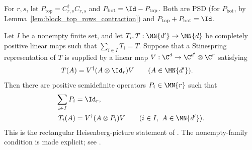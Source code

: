\begin{definition}
    \label{def:block_diag_projectors}
    \leanok
    For $r,s$, let $P_{\mathrm{top}}=C_{r,s}^\dagger C_{r,s}$ and
    $P_{\mathrm{bot}}=\Id-P_{\mathrm{top}}$. Both are PSD
    (for $P_{\mathrm{bot}}$, by Lemma~\ref{lem:block_top_rows_contraction})
    and $P_{\mathrm{top}}+P_{\mathrm{bot}}=\Id$.
\end{definition}

\begin{theorem}
    \label{thm:cp_radon_nikodym_of_stinespring}
    \leanok
    Let $I$ be a nonempty finite set, and let
    $T_i,T:\MN{d'}\to\MN{d}$ be completely positive linear maps such that
    $\sum_{i\in I}T_i=T$. Suppose that a Stinespring representation of $T$ is
    supplied by a linear map
    $V:\C^d\to\C^{d'}\otimes\C^r$ satisfying
    \begin{align}
        T(A)
        &=V^\dagger(A\otimes\Id_r)V
        \qquad (A\in\MN{d'}).
        \label{eq:representations_radon_dilation}
    \end{align}
    Then there are positive semidefinite operators $P_i\in\MN{r}$ such that
    \begin{align}
        \sum_{i\in I}P_i
        &=\Id_r,
        \label{eq:representations_radon_resolution}\\
        T_i(A)
        &=V^\dagger(A\otimes P_i)V
        \qquad (i\in I,\ A\in\MN{d'}).
        \label{eq:representations_radon_components}
    \end{align}
    This is the rectangular Heisenberg-picture statement of
    \cite[Theorem~2.4]{Wolf2012Quantum}. The nonempty-family condition is made
    explicit; see \cite{gap:wolf_radon_nikodym_nonempty_family}.
\end{theorem}

